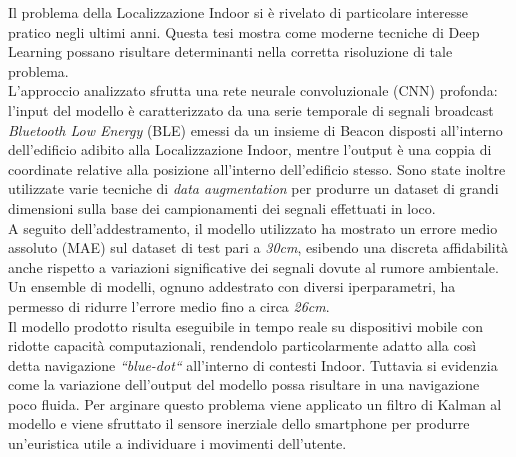 \documentclass{standalone}
\begin{document}
Il problema della Localizzazione Indoor si è rivelato di particolare interesse
pratico negli ultimi anni. Questa tesi mostra come moderne tecniche di Deep
Learning possano risultare determinanti nella corretta risoluzione di tale
problema.
\\
L'approccio analizzato sfrutta una rete neurale convoluzionale (CNN) profonda:
l'input del modello è caratterizzato da una serie temporale di segnali
broadcast \emph{Bluetooth Low Energy} (BLE) emessi da un insieme di Beacon
disposti all'interno dell'edificio adibito alla Localizzazione Indoor, mentre
l'output è una coppia di coordinate relative alla posizione all'interno
dell'edificio stesso. Sono state inoltre utilizzate varie tecniche di
\emph{data augmentation} per produrre un dataset di grandi dimensioni sulla
base dei campionamenti dei segnali effettuati in loco.
\\
A seguito dell'addestramento, il modello utilizzato ha mostrato un errore medio
assoluto (MAE) sul dataset di test pari a \emph{30cm}, esibendo una discreta
affidabilità anche rispetto a variazioni significative dei segnali dovute al
rumore ambientale. Un ensemble di modelli, ognuno addestrato con diversi
iperparametri, ha permesso di ridurre l'errore medio fino a circa \emph{26cm}.
\\
Il modello prodotto risulta eseguibile in tempo reale su dispositivi
mobile con ridotte capacità computazionali, rendendolo particolarmente adatto
alla 
così detta navigazione \emph{``blue-dot``} all'interno di contesti Indoor.
Tuttavia si evidenzia come la variazione dell'output del modello possa
risultare in una navigazione poco fluida. Per arginare questo problema viene
applicato un filtro di Kalman al modello e viene sfruttato il sensore inerziale
dello smartphone per produrre un'euristica utile a individuare i movimenti
dell'utente.  
\end{document}

